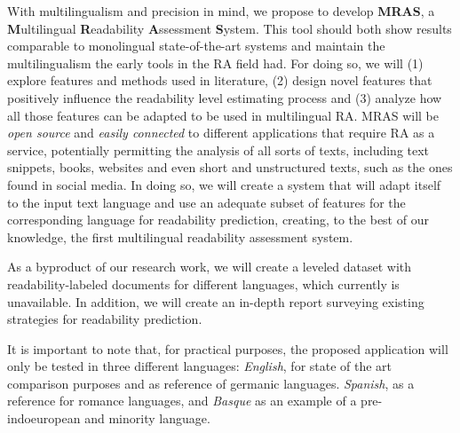 \documentclass{bsu-ms}
\begin{document}
With multilingualism and precision in mind, we propose to develop \textbf{MRAS}, a \textbf{M}ultilingual \textbf{R}eadability \textbf{A}ssessment \textbf{S}ystem. This tool should both show results comparable to monolingual state-of-the-art systems  and  maintain the multilingualism the early tools in the RA field had. For doing so, we will (1) explore features and methods used in literature, (2) design novel features that positively influence the readability level estimating process and (3) analyze how all those features can be adapted to be used in multilingual RA.
MRAS will be \textit{open source} and \textit{easily connected} to different applications that require RA as a service, potentially permitting the analysis of all sorts of texts, including text snippets, books, websites and even short and unstructured texts, such as the ones found in social media. In doing so, we will create a system that will adapt itself to the input text language and use an adequate subset of features for the corresponding language for readability prediction, creating, to the best of our knowledge, the first multilingual readability assessment system.

As a byproduct of our research work, we will create a leveled dataset with readability-labeled documents for different languages, which currently is unavailable. In addition, we will create an in-depth report surveying existing strategies for readability prediction.

It is important to note that, for practical purposes, the proposed application will only be tested in three different languages: \textit{English}, for state of the art comparison purposes and as reference of germanic languages. \textit{Spanish}, as a reference for romance languages, and \textit{Basque} as an example of a pre-indoeuropean and minority language.
\end{document}
